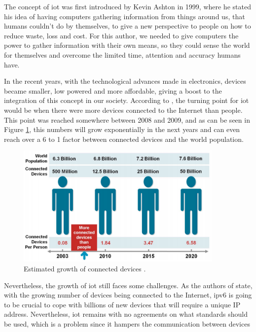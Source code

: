 The concept of \ac{iot} was first introduced by Kevin Ashton \cite{Ashton} in 1999, where he stated his idea of having computers gathering information from things around us, that humans couldn't do by themselves, to give a new perspective to people on how to reduce waste, loss and cost. For this author, we needed to give computers the power to gather information with their own means, so they could sense the world for themselves and overcome the limited time, attention and accuracy humans have.

In the recent years, with the technological advances made in electronics, devices became smaller, low powered and more affordable, giving a boost to the integration of this concept in our society. According to \cite{Evans2011}, the turning point for \ac{iot} would be when there were more devices connected to the Internet than people. This point was reached somewhere between 2008 and 2009, and as can be seen in Figure \ref{fig:iot_pic}, this numbers will grow exponentially in the next years and can even reach over a 6 to 1 factor between connected devices and the world population.

\begin{figure}[H]
	\centering
	\includegraphics[width=0.9\textwidth]{figures/iot_pic.png}
	\caption{Estimated growth of connected devices \cite{Evans2011}. }
	\label{fig:iot_pic}
\end{figure}

Nevertheless, the growth of \ac{iot} still faces some challenges. As the authors of \cite{Al-fuqaha2015} state, with the growing number of devices being connected to the Internet, \acf{ipv6} is going to be crucial to cope with billions of new devices that will require a unique IP address. Nevertheless, \ac{iot} remains with no agreements on what standards should be used, which is a problem since it hampers the communication between devices

